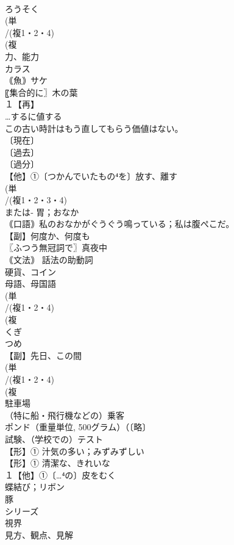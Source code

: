 \documentclass[8pt]{extreport}
\begin{document}
\begin{CJK}{UTF8}{min}
\\	ろうそく 
\\	(単
\\	/(複1・2・4)
\\	(複
\\	力、能力
\\	カラス 
\\	｟魚｠サケ 
\\	〖集合的に〗木の葉
\\	１【再】
\\	…するに値する 
\\	この古い時計はもう直してもらう価値はない。
\\	〔現在〕
\\	〔過去〕
\\	〔過分〕
\\	【他】①〔つかんでいたもの⁴を〕放す、離す
\\	(単
\\	/(複1・2・3・4)
\\	または‐ 胃；おなか 
\\	｟口語｠私のおなかがぐうぐう鳴っている；私は腹ぺこだ。 
\\	【副】何度か、何度も
\\	〖ふつう無冠詞で〗真夜中 
\\	｟文法｠ 話法の助動詞　
\\	硬貨、コイン 
\\	母語、母国語 
\\	(単
\\	/(複1・2・4)
\\	(複
\\	くぎ 
\\	つめ
\\	【副】先日、この間 
\\	(単
\\	/(複1・2・4)
\\	(複
\\	駐車場
\\	（特に船・飛行機などの）乗客 
\\	ポンド（重量単位, 500グラム）（〔略〕
\\	試験、（学校での）テスト 
\\	【形】① 汁気の多い；みずみずしい 
\\	【形】① 清潔な、きれいな 
\\	１【他】①〔…⁴の〕皮をむく 
\\	蝶結び；リボン
\\	豚 
\\	シリーズ
\\	視界 
\\	見方、観点、見解 

\end{CJK}
\end{document}
